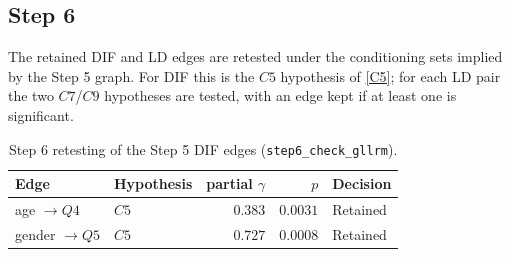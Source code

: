 \documentclass[12pt]{article}
\newcommand{\coauthortodo}[1]{%
  \marginnote{%
    \begin{tcolorbox}[
      width=\marginparwidth,
      colback=yellow!15!white, colframe=orange!70!black,
      colbacktitle=yellow!35!white, coltitle=black,
      title=TODO, fonttitle=\bfseries\scriptsize,
      toptitle=2pt, bottomtitle=2pt,
      fontupper=\scriptsize, boxrule=0.4pt, arc=1mm,
      boxsep=0pt, left=2pt, right=2pt, top=3pt, bottom=3pt,
      before skip=0pt, after skip=0pt
    ]
      \raggedright #1
    \end{tcolorbox}%
  }%
}
\theoremstyle{examplestyle}
\begin{document}
\subsection{Step 6}


The retained DIF and LD edges are retested under the conditioning sets implied by the Step 5 graph. For DIF this is the $C5$ hypothesis of \eqref{C5}; for each LD pair the two $C7$/$C9$ hypotheses are tested, with an edge kept if at least one is significant.

\begin{table}[H]
\centering
\begin{tabular}{@{}llrrl@{}}
\toprule
Edge & Hypothesis & partial $\gamma$ & $p$ & Decision \\
\midrule
age $\to Q4$ & $C5$ & $0.383$ & $0.0031$ & Retained \\
gender $\to Q5$ & $C5$ & $0.727$ & $0.0008$ & Retained \\
\bottomrule
\end{tabular}
\caption{Step 6 retesting of the Step 5 DIF edges (\texttt{step6\_check\_gllrm}).}
\label{tab:ak_step6_dif}
\end{table}

\end{document}
